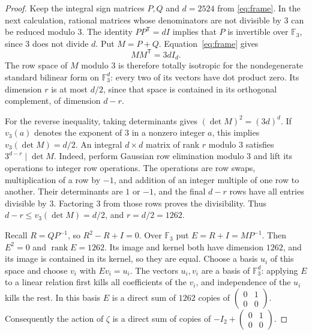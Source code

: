 \documentclass[10pt]{article}
\newcommand{\F}{\mathbb F}
\begin{document}
\begin{proof}
Keep the integral sign matrices $P,Q$ and $d=2524$ from
\eqref{eq:frame}. In the next calculation, rational matrices whose
denominators are not divisible by $3$ can be reduced modulo $3$.
The identity $PP^{\mathsf T}=dI$ implies that $P$ is invertible over
$\F_3$, since $3$ does not divide $d$. Put $M=P+Q$.
Equation~\eqref{eq:frame} gives
\[
 MM^{\mathsf T}=3dI_d.
\]
The row space of $M$ modulo $3$ is therefore totally isotropic for the
nondegenerate standard bilinear form on $\F_3^d$: every two of its
vectors have dot product zero. Its dimension $r$ is at most $d/2$,
since that space is contained in its orthogonal complement, of
dimension $d-r$.

For the reverse inequality, taking determinants gives
$(\det M)^2=(3d)^d$. If $v_3(a)$ denotes the exponent of $3$ in a
nonzero integer $a$, this implies $v_3(\det M)=d/2$.
An integral $d\times d$ matrix of rank $r$ modulo $3$ satisfies
$3^{d-r}\mid\det M$. Indeed, perform Gaussian row elimination modulo
$3$ and lift its operations to integer row operations. The operations
are row swaps, multiplication of a row by $-1$, and addition of an
integer multiple of one row to another. Their determinants are $1$ or
$-1$, and the final $d-r$ rows have all entries divisible by $3$.
Factoring $3$ from those rows proves the divisibility. Thus
$d-r\leq v_3(\det M)=d/2$, and $r=d/2=1262$.

Recall $R=QP^{-1}$, so $R^2-R+I=0$. Over $\F_3$ put
$E=R+I=MP^{-1}$. Then $E^2=0$ and $\operatorname{rank}E=1262$.
Its image and kernel both have dimension $1262$, and its image is
contained in its kernel, so they are equal. Choose a basis $u_i$ of
this space and choose $v_i$ with $Ev_i=u_i$. The vectors $u_i,v_i$
are a basis of $\F_3^d$: applying $E$ to a linear relation first kills
all coefficients of the $v_i$, and independence of the $u_i$ kills
the rest. In this basis $E$ is a direct sum of $1262$ copies of
$\left(\begin{smallmatrix}0&1\\0&0\end{smallmatrix}\right)$.
Consequently the action of $\zeta$ is a direct sum of copies of
$-I_2+\left(\begin{smallmatrix}0&1\\0&0\end{smallmatrix}\right)$.


\end{proof}
\end{document}
